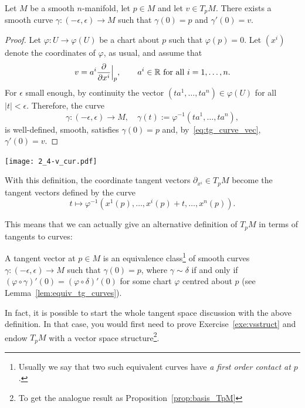 \begin{theorem}
  Let $M$ be a smooth $n$-manifold, let $p\in M$ and let $v\in T_pM$.
  There exists a smooth curve $\gamma: (-\epsilon,\epsilon) \to M$ such that $\gamma(0)=p$ and $\gamma'(0) = v$.
\end{theorem}
\begin{proof}
  Let $\varphi:U\to\varphi(U)$ be a chart about $p$ such that $\varphi(p)=0$.
  Let $(x^i)$ denote the coordinates of $\varphi$, as usual, and assume that
  \begin{equation}
    v = a^i \frac{\partial}{\partial x^i}\Big|_p, \qquad a^i \in\mathbb{R} \mbox{ for all } i=1,\ldots,n.
  \end{equation}
  For $\epsilon$ small enough, by continuity the vector $(ta^1, \ldots, ta^n) \in \varphi(U)$ for all $|t|<\epsilon$. Therefore, the curve
  \begin{equation}
    \gamma: (-\epsilon, \epsilon) \to M, \quad \gamma(t):=\varphi^{-1}(ta^1, \ldots, ta^n),
  \end{equation}
  is well-defined, smooth, satisfies $\gamma(0) = p$ and, by~\eqref{eq:tg_curve_vec}, $\gamma'(0) = v$.
\end{proof}

\begin{marginfigure}
  \texttt{[image: 2\_4-v\_cur.pdf]}
  \caption{With this definition, the coordinate tangent vectors $\partial_{x^i}\in T_p M$ become the tangent vectors defined by the curve \[t \mapsto \varphi^{-1}(x^1(p), \ldots, {x^i(p) + t}, \ldots, x^n(p)).\]}
  \label{fig:2_4-v_cur}
\end{marginfigure}
This means that we can actually give an alternative definition of $T_pM$ in terms of tangents to curves:
\begin{definition}\label{def:tg:ascurvespeed}
  A tangent vector at $p\in M$ is an equivalence class\footnote{Usually we say that two such equivalent curves have \emph{a first order contact at $p$}.} of smooth curves $\gamma:(-\epsilon, \epsilon)\to M$ such that $\gamma(0)=p$, where $\gamma\sim\delta$ if and only if $(\varphi\circ \gamma)'(0) = (\varphi\circ\delta)'(0)$ for some chart $\varphi$ centred about $p$ (see Lemma~\ref{lem:equiv_tg_curves}).
\end{definition}

In fact, it is possible to start the whole tangent space discussion with the above definition. In that case, you would first need to prove Exercise~\ref{exe:vsstruct} and endow $T_pM$ with a vector space structure\footnote{To get the analogue result as Proposition~\ref{prop:basis_TpM}}.

